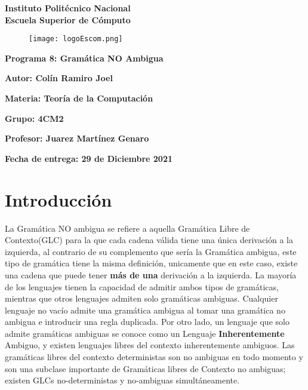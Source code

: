 \documentclass{article}
\begin{document}
	\begin{titlepage}
		\begin{center}
			{\huge\textbf{Instituto Politécnico Nacional}}\\
			\vspace{7mm}
			{\huge\textbf{Escuela Superior de Cómputo}}\\			
			\begin{figure}[h]
				\centering
				\texttt{[image: logoEscom.png]}
			\end{figure}	
			\vspace{1cm}
			{\huge\textbf{Programa 8: Gramática NO Ambigua}}
			\par\vspace{2cm}
			\large\textbf{Autor: Colín Ramiro Joel}
			\par\vspace{1cm}
			{\large\textbf{Materia: Teoría de la Computación}}
			\par\vspace{1cm}
			{\large\textbf{Grupo: 4CM2}}
			\par\vspace{1cm}
			{\large\textbf{Profesor: Juarez Martínez Genaro}}
			\par\vspace{1cm}
			{\large\textbf{Fecha de entrega: {\huge{29 de Diciembre 2021}}}}
			\par\vspace{3cm}
		\end{center}
	\end{titlepage}
	
	
	\section*{Introducción}
	La Gramática NO ambigua se refiere a aquella Gramática Libre de Contexto(GLC) para la que cada cadena válida tiene una única derivación a la izquierda, al contrario de su complemento que sería la Gramática ambigua, este tipo de gramática tiene la misma definición, unicamente que en este caso, existe una cadena que puede tener \textbf{más de una} derivación a la izquierda.
	La mayoría de los lenguajes tienen la capacidad de admitir ambos tipos de gramáticas, mientras que otros lenguajes admiten solo gramáticas ambiguas. Cualquier lenguaje no vacío admite una gramática ambigua al tomar una gramática no ambigua e introducir una regla duplicada. Por otro lado, un lenguaje que solo admite gramáticas ambiguas se conoce como un Lenguaje \textbf{Inherentemente} Ambiguo, y existen lenguajes libres del contexto inherentemente ambiguos. 
	Las gramáticas libres del contexto deterministas son no ambiguas en todo momento y son una subclase importante de Gramáticas libres de Contexto no ambiguas; existen GLCs no-deterministas y no-ambiguas simultáneamente.
	
\end{document}
